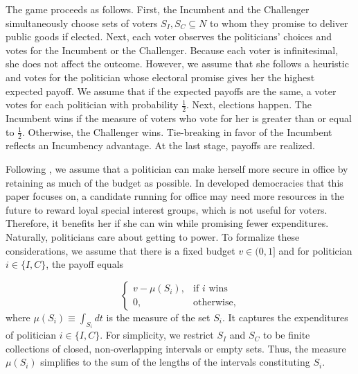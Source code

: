 \documentclass[12pt,english]{article}
\begin{document}
The game proceeds as follows. First, the Incumbent and the Challenger simultaneously choose sets of voters $S_I, S_C \subseteq N$ to whom they promise to deliver public goods if elected. Next, each voter observes the politicians' choices and votes for the Incumbent or the Challenger. Because each voter is infinitesimal, she does not affect the outcome. However, we assume that she follows a heuristic and votes for the politician whose electoral promise gives her the highest expected payoff. We assume that if the expected payoffs are the same, a voter votes for each politician with probability $\frac{1}{2}$. Next, elections happen. The Incumbent wins if the measure of voters who vote for her is greater than or equal to $\frac{1}{2}$. Otherwise, the Challenger wins. Tie-breaking in favor of the Incumbent reflects an Incumbency advantage. At the last stage, payoffs are realized. 

Following \cite{de2005logic}, we assume that a politician can make herself more secure in office by retaining as much of the budget as possible. In developed democracies that this paper focuses on, a candidate running for office may need more resources in the future to reward loyal special interest groups, which is not useful for voters. Therefore, it benefits her if she can win while promising fewer expenditures. Naturally, politicians care about getting to power. To formalize these considerations, we assume that there is a fixed budget $v\in (0,1]$ and for politician $i \in \{I,C\}$, the payoff equals 

\begin{equation*}
\begin{cases}
		 v - \mu(S_i), & \text{if $i$ wins}\\
           0, &  \text{otherwise,}
		 \end{cases}
\end{equation*}
where $\mu(S_i) \equiv \int_{S_i} dt$ is the measure of the set $S_i$. It captures the expenditures of politician $i \in \{I,C\}$.
For simplicity, we restrict $S_I$ and $S_C$ to be finite collections of closed, non-overlapping intervals or empty sets. Thus, the measure $\mu(S_i)$ simplifies to the sum of the lengths of the intervals constituting $S_i$.
\end{document}
